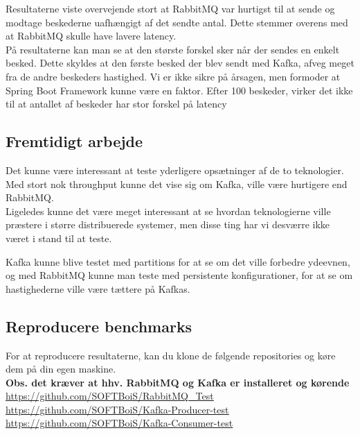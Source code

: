 \documentclass[
]{article}
\begin{document}
Resultaterne viste overvejende stort at RabbitMQ var hurtigst til at
sende og modtage beskederne uafhængigt af det sendte antal. Dette
stemmer overens med at RabbitMQ skulle have lavere latency.\cite{kafka-rabbit-comparison}\\
På resultaterne kan man se at den største forskel sker når der sendes en
enkelt besked. Dette skyldes at den første besked der blev sendt med
Kafka, afveg meget fra de andre beskeders hastighed. Vi er ikke sikre på
årsagen, men formoder at Spring Boot Framework kunne være en faktor.
Efter 100 beskeder, virker det ikke til at antallet af beskeder har stor
forskel på latency

\hypertarget{fremtidigt-arbejde}{%
\subsection{Fremtidigt arbejde}\label{fremtidigt-arbejde}}

Det kunne være interessant at teste yderligere opsætninger af de to
teknologier.\\
Med stort nok throughput kunne det vise sig om Kafka, ville være
hurtigere end RabbitMQ.\\
Ligeledes kunne det være meget interessant at se hvordan teknologierne
ville præstere i større distribuerede systemer, men disse ting har vi
desværre ikke været i stand til at teste.

Kafka kunne blive testet med partitions for at se om det ville forbedre
ydeevnen, og med RabbitMQ kunne man teste med persistente
konfigurationer, for at se om hastighederne ville være tættere på
Kafkas.

\hypertarget{reproducere-benchmarks}{%
\subsection{Reproducere benchmarks}\label{reproducere-benchmarks}}

For at reproducere resultaterne, kan du klone de følgende repositories
og køre dem på din egen maskine.\\
\textbf{Obs. det kræver at hhv. RabbitMQ og Kafka er installeret og
kørende}\\
\href{https://github.com/SOFTBoiS/RabbitMQ_Test}{\underline{https://github.com/SOFTBoiS/RabbitMQ\_Test}}\\
\href{https://github.com/SOFTBoiS/Kafka-Producer-test}{\underline{https://github.com/SOFTBoiS/Kafka-Producer-test}}\\
\href{https://github.com/SOFTBoiS/Kafka-Consumer-test}{\underline{https://github.com/SOFTBoiS/Kafka-Consumer-test}}
\end{document}
